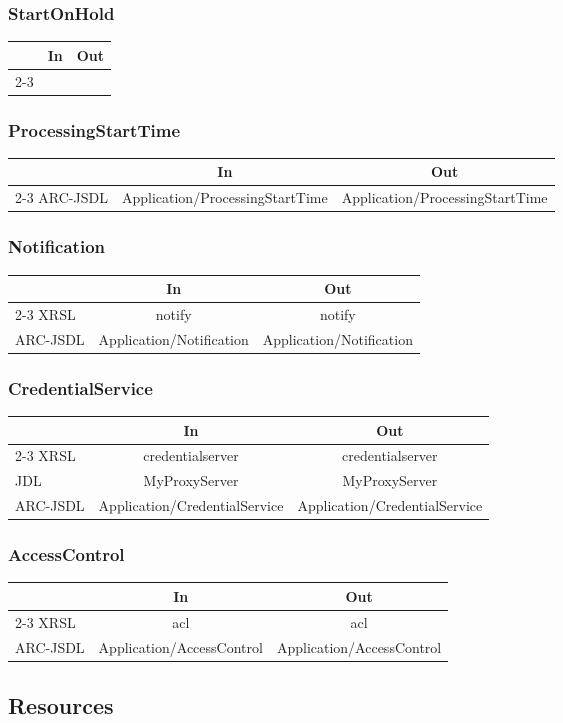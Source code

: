 \documentclass{article}
\newenvironment{inouttabular}%
{\begin{center}\begin{tabular}{l>{\ttfamily\footnotesize}c>{\ttfamily\footnotesize}c}%
\toprule
& \textnormal{\normalsize{In}} & \textnormal{\normalsize{Out}}\\ \cmidrule{2-3}}
{\bottomrule\end{tabular}\end{center}}
\begin{document}
\subsubsection{StartOnHold}
\begin{inouttabular}
\end{inouttabular}

\subsubsection{ProcessingStartTime}
\begin{inouttabular}
ARC-JSDL & Application/ProcessingStartTime & Application/ProcessingStartTime\\
\end{inouttabular}

\subsubsection{Notification}
\begin{inouttabular}
XRSL & notify & notify\\
ARC-JSDL & Application/Notification & Application/Notification\\
\end{inouttabular}

\subsubsection{CredentialService}
\begin{inouttabular}
XRSL & credentialserver & credentialserver\\
JDL & MyProxyServer & MyProxyServer\\
ARC-JSDL & Application/CredentialService & Application/CredentialService\\
\end{inouttabular}

\subsubsection{AccessControl}
\begin{inouttabular}
XRSL & acl & acl\\
ARC-JSDL & Application/AccessControl & Application/AccessControl\\
\end{inouttabular}

\subsection{Resources}
\end{document}
